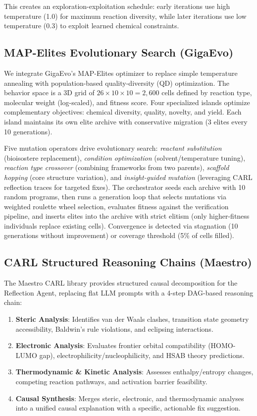 \documentclass{article}
\begin{document}
This creates an exploration-exploitation schedule: early iterations use high temperature (1.0) for maximum reaction diversity, while later iterations use low temperature (0.3) to exploit learned chemical constraints.

\subsection{MAP-Elites Evolutionary Search (GigaEvo)}

We integrate GigaEvo's MAP-Elites optimizer to replace simple temperature annealing with population-based quality-diversity (QD) optimization. The behavior space is a 3D grid of $26 \times 10 \times 10 = 2,600$ cells defined by reaction type, molecular weight (log-scaled), and fitness score. Four specialized islands optimize complementary objectives: chemical diversity, quality, novelty, and yield. Each island maintains its own elite archive with conservative migration (3 elites every 10 generations).

Five mutation operators drive evolutionary search: \textit{reactant substitution} (bioisostere replacement), \textit{condition optimization} (solvent/temperature tuning), \textit{reaction type crossover} (combining frameworks from two parents), \textit{scaffold hopping} (core structure variation), and \textit{insight-guided mutation} (leveraging CARL reflection traces for targeted fixes). The orchestrator seeds each archive with 10 random programs, then runs a generation loop that selects mutations via weighted roulette wheel selection, evaluates fitness against the verification pipeline, and inserts elites into the archive with strict elitism (only higher-fitness individuals replace existing cells). Convergence is detected via stagnation (10 generations without improvement) or coverage threshold (5\% of cells filled).

\subsection{CARL Structured Reasoning Chains (Maestro)}

The Maestro CARL library provides structured causal decomposition for the Reflection Agent, replacing flat LLM prompts with a 4-step DAG-based reasoning chain:

\begin{enumerate}
    \item \textbf{Steric Analysis}: Identifies van der Waals clashes, transition state geometry accessibility, Baldwin's rule violations, and eclipsing interactions.
    \item \textbf{Electronic Analysis}: Evaluates frontier orbital compatibility (HOMO-LUMO gap), electrophilicity/nucleophilicity, and HSAB theory predictions.
    \item \textbf{Thermodynamic \& Kinetic Analysis}: Assesses enthalpy/entropy changes, competing reaction pathways, and activation barrier feasibility.
    \item \textbf{Causal Synthesis}: Merges steric, electronic, and thermodynamic analyses into a unified causal explanation with a specific, actionable fix suggestion.
\end{enumerate}
\end{document}
